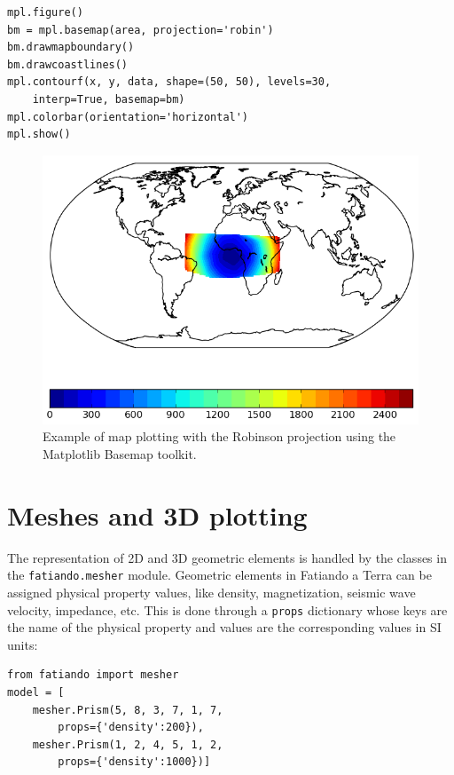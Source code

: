\begin{verbatim}
mpl.figure()
bm = mpl.basemap(area, projection='robin')
bm.drawmapboundary()
bm.drawcoastlines()
mpl.contourf(x, y, data, shape=(50, 50), levels=30,
    interp=True, basemap=bm)
mpl.colorbar(orientation='horizontal')
mpl.show()
\end{verbatim}

\begin{figure}
    \centering
    \includegraphics[width=\textwidth]{figures/paper1/gridding_plotting_basemap}
    \caption{
        Example of map plotting with the Robinson projection using the
        Matplotlib Basemap toolkit.
    }
    \label{fig:basemap}
\end{figure}



\section{Meshes and 3D plotting}

The representation of 2D and 3D geometric elements is handled by the
classes in the \texttt{fatiando.mesher} module. Geometric elements in
Fatiando a Terra can be assigned physical property values, like density,
magnetization, seismic wave velocity, impedance, etc. This is done
through a \texttt{props} dictionary whose keys are the name of the
physical property and values are the corresponding values in SI units:

\begin{verbatim}
from fatiando import mesher
model = [
    mesher.Prism(5, 8, 3, 7, 1, 7,
        props={'density':200}),
    mesher.Prism(1, 2, 4, 5, 1, 2,
        props={'density':1000})]
\end{verbatim}

